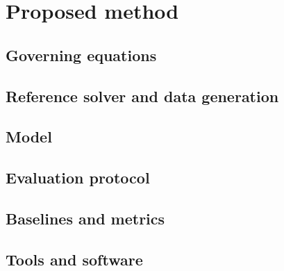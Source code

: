 
\section{Proposed method}
\label{sec:method}


\subsection{Governing equations}
\label{sec:equations}


\subsection{Reference solver and data generation}
\label{sec:data}


\subsection{Model}
\label{sec:model}


\subsection{Evaluation protocol}
\label{sec:evaluation}


\subsection{Baselines and metrics}
\label{sec:metrics}


\subsection{Tools and software}
\label{sec:tools}

